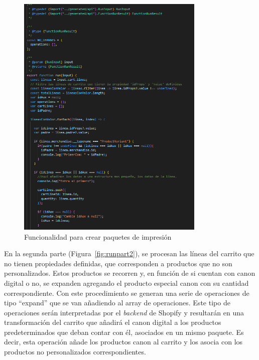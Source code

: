 \documentclass[11pt]{article}
\begin{document}
\begin{figure}[H]
    \centering
    \includegraphics[width=0.8\textwidth]{imagenes-tema/primeraParteFunction.png}
    \caption{\label{fig:runpart1} Funcionalidad para crear paquetes de impresión} 
    \vspace{\fill}
\end{figure}

En la segunda parte (Figura~\ref{fig:runpart2}), se procesan las líneas del carrito que no tienen propiedades definidas, que corresponden a productos que no son personalizados. Estos productos se recorren y, en función de si cuentan con canon digital o no, se expanden agregando 
el producto especial canon con su cantidad correspondiente. Con este procedimiento se generan una serie de operaciones de tipo ``expand'' que se van añadiendo al array de operaciones. Este tipo de operaciones
serán interpretadas por el \textit{backend} de Shopify y resultarán en una transformación del carrito que añadirá el canon digital a los productos predeterminados que deban contar con él, asociados en un mismo paquete. Es decir, esta operación añade los productos canon al carrito
y los asocia con los productos no personalizados correspondientes.
\end{document}
